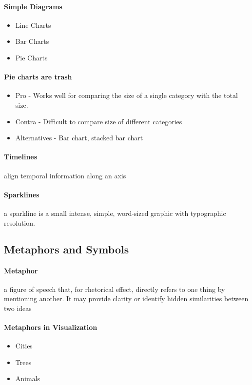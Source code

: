 \documentclass[10pt,a4paper]{article}
\begin{document}
			\paragraph{Simple Diagrams}
				\begin{itemize}
					\item Line Charts
					\item Bar Charts
					\item Pie Charts
				\end{itemize}
			
			\paragraph{Pie charts are trash}
				\begin{itemize}
					\item Pro - Works well for comparing the size of a single category with the total size. 
					\item Contra - Difficult to compare size of different categories
					\item Alternatives - Bar chart, stacked bar chart
				\end{itemize}
			
			\paragraph{Timelines} align temporal information along an axis
		
			\paragraph{Sparklines} a sparkline is a small intense, simple, word-sized graphic with typographic resolution.
		
		\subsection{Metaphors and Symbols}
			\paragraph{Metaphor} a figure of speech that, for rhetorical effect, directly refers to one thing by mentioning another. It may provide clarity or identify hidden similarities between two ideas
			
			\paragraph{Metaphors in Visualization}
				\begin{itemize}
					\item Cities
					\item Trees
					\item Animals
				\end{itemize}
			
\end{document}
